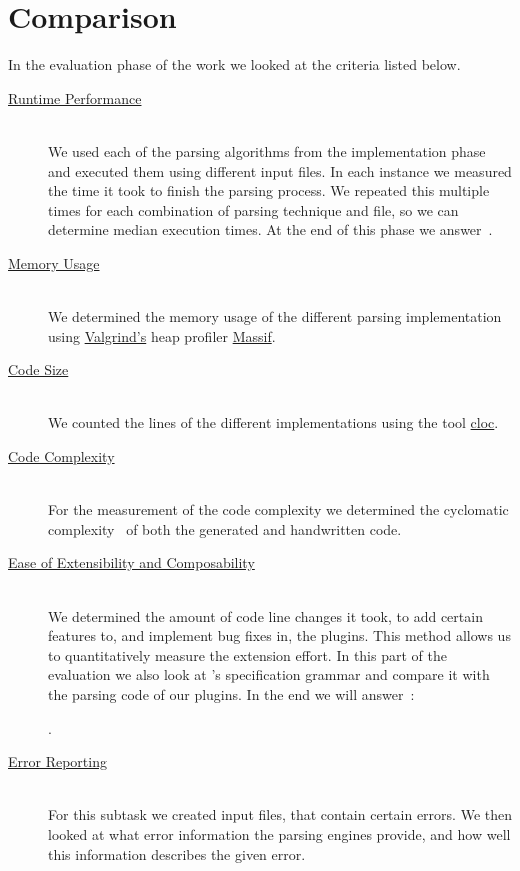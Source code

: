 \chapter{Comparison}

In the evaluation phase of the work we looked at the criteria listed below.

\begin{description}

  \item[{\hyperref[sec:run_time_performance]{Runtime Performance}}]~\\[0.1cm]
  We used each of the parsing algorithms from the implementation phase and executed them using different input files. In each instance we measured the time it took to finish the parsing process. We repeated this multiple times for each combination of parsing technique and file, so we can determine median execution times. At the end of this phase we answer~.

  \speed*

  \item[{\hyperref[sec:memory_usage]{Memory Usage}}]~\\[0.1cm]
  We determined the memory usage of the different parsing implementation using \href{http://valgrind.org}{Valgrind's} heap profiler \href{http://valgrind.org/docs/manual/ms-manual.html}{Massif}.

  \item[{\hyperref[sec:code_size]{Code Size}}]~\\[0.1cm]
  We counted the lines of the different implementations using the tool \href{https://github.com/AlDanial/cloc}{cloc}.

  \item[{\hyperref[sec:code_complexity]{Code Complexity}}]~\\[0.1cm]
  For the measurement of the code complexity we determined the cyclomatic complexity~\cite{mccabe1976complexity} of both the generated and handwritten code.

  \item[{\hyperref[sec:extensibility]{Ease of Extensibility and Composability}}]~\\[0.1cm]
  We determined the amount of code line changes it took, to add certain features to, and implement bug fixes in, the  plugins. This method allows us to quantitatively measure the extension effort. In this part of the evaluation we also look at ’s specification grammar and compare it with the parsing code of our plugins. In the end we will answer~:

  \closeness*

  .

  \item[{\hyperref[sec:error_reporting]{Error Reporting}}]~\\[0.1cm]
  For this subtask we created  input files, that contain certain errors. We then looked at what error information the parsing engines provide, and how well this information describes the given error.

\end{description}


